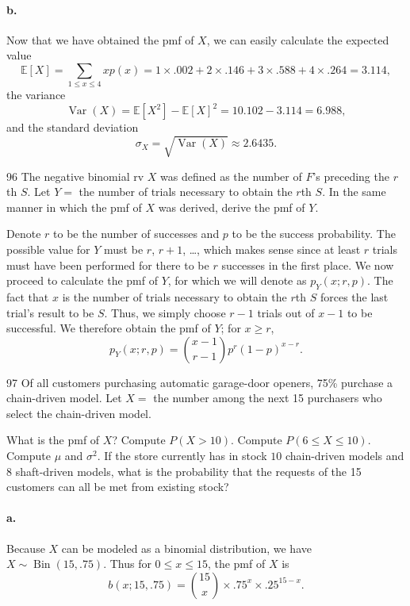 \documentclass{exam}
\DeclareMathOperator{\Var}{Var}
\DeclareMathOperator{\Bin}{Bin}
\begin{document}
\paragraph{b.} Now that we have obtained the pmf of $X$, we can easily calculate the expected value
\[
	\mathbb E[X] = \sum_{1 \le x \le 4} xp(x) = 1 \times .002 + 2 \times .146 + 3 \times .588 + 4 \times .264 = 3.114,
\]
the variance
\[
	\Var(X) = \mathbb E[X^2] - \mathbb E[X]^2 = 10.102 - 3.114 = 6.988,
\]
and the standard deviation
\[
	\sigma_X = \sqrt{\Var(X)} \approx 2.6435.
\]

\begin{problem}{96}
	The negative binomial rv $X$ was defined as the number of $F$'s preceding the $r$th $S$. Let $Y =$ the number of trials necessary to obtain the $r$th $S$. In the same manner in which the pmf of $X$ was derived, derive the pmf of $Y$.
\end{problem}

Denote $r$ to be the number of successes and $p$ to be the success probability. The possible value for $Y$ must be $r$, $r + 1$, \dots, which makes sense since at least $r$ trials must have been performed for there to be $r$ successes in the first place. We now proceed to calculate the pmf of $Y$, for which we will denote as $p_Y(x; r, p)$. The fact that $x$ is the number of trials necessary to obtain the $r$th $S$ forces the last trial's result to be $S$. Thus, we simply choose $r - 1$ trials out of $x - 1$ to be successful. We therefore obtain the pmf of $Y$; for $x \ge r$,
\[
	p_Y(x; r, p) = \binom{x - 1}{r - 1}p^r(1 - p)^{x - r}.
\]

\begin{problem}{97}
	Of all customers purchasing automatic garage-door openers, 75\% purchase a chain-driven model. Let $X =$ the number among the next 15 purchasers who select the chain-driven model.
	\begin{tasks}[label=\textbf{\alph*.}]
		\task What is the pmf of $X$?
		\task Compute $P(X > 10)$.
		\task Compute $P(6 \le X \le 10)$.
		\task Compute $\mu$ and $\sigma^2$.
		\task If the store currently has in stock $10$ chain-driven models and $8$ shaft-driven models, what is the probability that the requests of the 15 customers can all be met from existing stock?
	\end{tasks}
\end{problem}

\paragraph{a.} Because $X$ can be modeled as a binomial distribution, we have $X \sim \Bin(15, .75)$. Thus for $0 \le x \le 15$, the pmf of $X$ is
\[
	b(x; 15, .75) = \binom{15}x \times .75^x \times .25^{15 - x}.
\]
\end{document}
